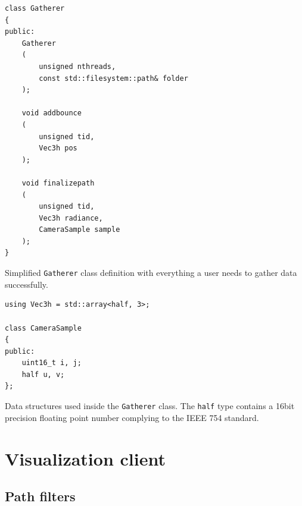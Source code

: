 \begin{Listing}
	\begin{lstlisting}
class Gatherer
{
public:
	Gatherer
	(
		unsigned nthreads, 
		const std::filesystem::path& folder
	);

	void addbounce
	(
		unsigned tid, 
		Vec3h pos
	);

	void finalizepath
	(
		unsigned tid, 
		Vec3h radiance, 
		CameraSample sample
	);
}
	\end{lstlisting}
	\caption{Simplified \texttt{Gatherer} class definition with everything a user needs to gather data successfully.}
	\label{gatherer_signatures}
\end{Listing}

\begin{Listing}
	\begin{lstlisting}
using Vec3h = std::array<half, 3>;

class CameraSample
{
public:
	uint16_t i, j;
	half u, v;
};
	\end{lstlisting}
	\caption{Data structures used inside the \texttt{Gatherer} class. The \texttt{half} type contains a 16bit precision floating point number complying to the IEEE 754 standard.}
	\label{gatherer_datastructures}
\end{Listing}


\section{Visualization client}

\subsection{Path filters}
\label{path_filters}

